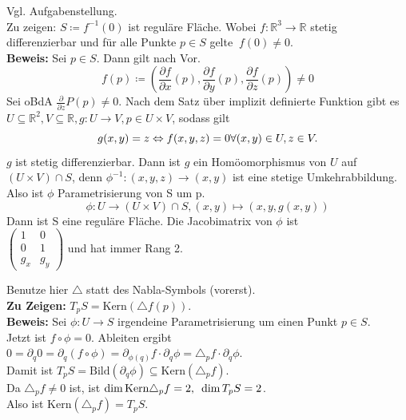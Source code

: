 \begin{problem}[1a]
  Vgl. Aufgabenstellung. \\
  Zu zeigen: \( S \coloneqq f^{-1}(0) \) ist reguläre Fläche. Wobei \( f: \mathbb{R}^3 \to \mathbb{R} \) stetig differenzierbar und für alle Punkte \( p \in S \) gelte \( \ f(0) \neq 0 \). \\
  \textbf{Beweis:} Sei \( p \in S \). Dann gilt nach Vor.
  \begin{equation*}
    f(p) \coloneqq \left(\frac{\partial f}{\partial x}(p), 
    \frac{\partial f}{\partial y}(p), 
    \frac{\partial f}{\partial z}(p) \right) \neq 0
  \end{equation*}
  Sei oBdA \( \frac{\partial}{\partial z} P(p) \neq 0 \). Nach dem Satz über implizit definierte Funktion gibt es\\
  \( U \subseteq \mathbb{R}^2, V \subseteq \mathbb{R}, g: U \to V, p \in U \times V \), sodass gilt\\
  \begin{equation*}
    g(x,y) = z \Leftrightarrow f(x,y,z) = 0 \hfill \forall (x,y) \in U, z \in V. \\
  \end{equation*}
  \( g \) ist stetig differenzierbar. Dann ist \( g \) ein Homöomorphismus von \( U \) auf \( (U \times V) \cap S \), denn \( \phi^{-1}:(x,y,z) \to (x,y) \) ist eine stetige Umkehrabbildung. \\
  Also ist \( \phi \) Parametrisierung von S um p.
  \begin{equation*}
    \phi: U \to (U \times V) \cap S, (x,y) \mapsto (x,y,g(x,y))
  \end{equation*}
  Dann ist S eine reguläre Fläche.
  Die Jacobimatrix von \( \phi \) ist\\ 
  \( \begin{pmatrix}
    1 & 0 \\
    0 & 1 \\
    g_x & g_y
  \end{pmatrix} \) und hat immer Rang 2.
\end{problem}

\begin{problem}[1b] Benutze hier \( \triangle \) statt des Nabla-Symbols (vorerst). \\
  \textbf{Zu Zeigen:} \( T_p S = \text{Kern}(\triangle f(p)) \). \\
  \textbf{Beweis:} Sei \( \phi: U \to S \) irgendeine Parametrisierung um einen Punkt \( p \in S \). \\
  Jetzt ist \( f \circ \phi = 0 \). Ableiten ergibt \\
  \( 0 = \partial_q 0 = \partial_q (f \circ \phi) = \partial_{\phi(q)}f \cdot \partial_q \phi = \triangle_p f \cdot \partial_q \phi \). \\
  Damit ist \( T_p S = \text{Bild}(\partial_q \phi) \subseteq \text{Kern}(\triangle_p f) \). \\
  Da \( \triangle_p f \neq 0 \) ist, ist \( \dim\text{Kern} \triangle_p f = 2\text{,}\enskip \dim T_p S = 2 \). \\
  Also ist \( \text{Kern}(\triangle_p f) = T_pS \).
  
\end{problem}

